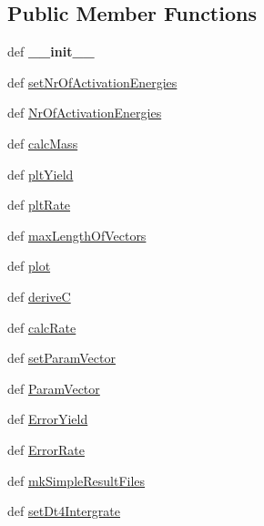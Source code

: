 \subsection*{\-Public \-Member \-Functions}
\begin{DoxyCompactItemize}
\item 
\hypertarget{classModels_1_1DAEM_aaa4b8bfa19485b2fd0684591d22540cb}{def {\bfseries \-\_\-\-\_\-init\-\_\-\-\_\-}}\label{classModels_1_1DAEM_aaa4b8bfa19485b2fd0684591d22540cb}

\item 
def \hyperlink{classModels_1_1DAEM_afd55a45fe616072ef780797eecc2e2e3}{set\-Nr\-Of\-Activation\-Energies}
\item 
def \hyperlink{classModels_1_1DAEM_ad3e09dbccde653e39af7dec35ea06f9b}{\-Nr\-Of\-Activation\-Energies}
\item 
def \hyperlink{classModels_1_1DAEM_ac861fdf6e0863a4e20f88021cb0e85c9}{calc\-Mass}
\item 
def \hyperlink{classModels_1_1Model_a317ed848b969dbe3a96dd05e8b771900}{plt\-Yield}
\item 
def \hyperlink{classModels_1_1Model_aa35c741babf8f141df48c4021e0664e4}{plt\-Rate}
\item 
def \hyperlink{classModels_1_1Model_a3396d6ca1a7b7d66e55ada8c3c7a509e}{max\-Length\-Of\-Vectors}
\item 
def \hyperlink{classModels_1_1Model_ae404a691e48bfe4eafcdfdd09f1dae48}{plot}
\item 
def \hyperlink{classModels_1_1Model_a010945ed2adff59a7a5fce36025e7a97}{derive\-C}
\item 
def \hyperlink{classModels_1_1Model_a7c9280e33f9e0d46703cebc131008c65}{calc\-Rate}
\item 
def \hyperlink{classModels_1_1Model_a818f207e2a4bd0e9a3720ca611960e5a}{set\-Param\-Vector}
\item 
def \hyperlink{classModels_1_1Model_a13c76a0fe24d43cdc4d21fbc73fa96fa}{\-Param\-Vector}
\item 
def \hyperlink{classModels_1_1Model_ad3e627980d9e781bf7b2c9ff900ca06b}{\-Error\-Yield}
\item 
def \hyperlink{classModels_1_1Model_a3050eb39341f318d8d88b172f88bd240}{\-Error\-Rate}
\item 
def \hyperlink{classModels_1_1Model_adcb987bccae63a742490ea1e6d5f7a74}{mk\-Simple\-Result\-Files}
\item 
def \hyperlink{classModels_1_1Model_ac28252ae5cd6b5ecd4c5d006a0e6567d}{set\-Dt4\-Intergrate}
\end{DoxyCompactItemize}
